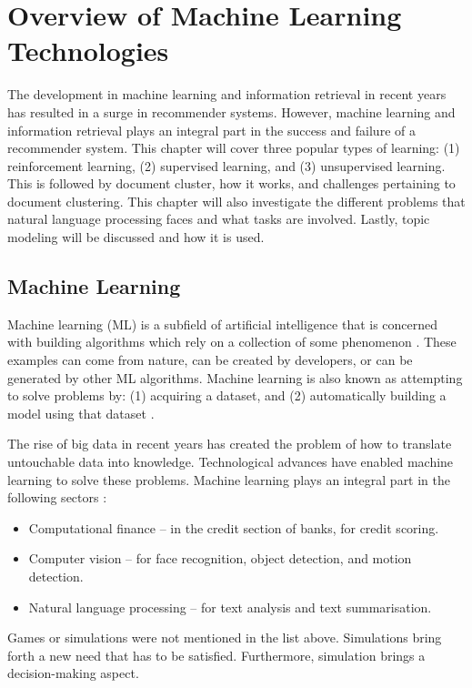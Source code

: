\chapter{Overview of Machine Learning Technologies}
\label{chap: Chapter 3}
The development in machine learning and information retrieval in recent years has resulted in a surge in recommender systems. However, machine learning and information retrieval plays an integral part in the success and failure of a recommender system. This chapter  will cover three popular types of learning: (1) reinforcement learning, (2) supervised learning, and (3) unsupervised learning. This is followed by document cluster, how it works, and challenges pertaining to document clustering. This chapter will also investigate the different problems that natural language processing faces and what tasks are involved.
Lastly, topic modeling will be discussed and how it is used.

\section{Machine Learning} \label{ssec:MLoverview}

Machine learning (ML) is a subfield of artificial intelligence that is concerned with building algorithms which rely on a collection of some phenomenon \cite{Andriybook2019}. These examples can come from nature, can be created by developers, or can be generated by other ML algorithms. Machine learning is also known as attempting to solve problems by: (1) acquiring a dataset, and (2) automatically building a model using that dataset \cite{sebastiani2002machine}. 

The rise of big data in recent years has created the problem of how to translate untouchable data into knowledge. Technological advances have enabled machine learning to solve these problems. Machine learning plays an integral part in the following sectors \cite{alpaydin2009introduction}:

\begin{itemize}
  \item Computational finance – in the credit section of banks, for credit scoring.
  \item Computer vision – for face recognition, object detection, and motion detection.
  \item Natural language processing – for text analysis and text summarisation.
\end{itemize}

Games or simulations were not mentioned in the list above. Simulations bring forth a new need that has to be satisfied. Furthermore, simulation brings a decision-making aspect.

